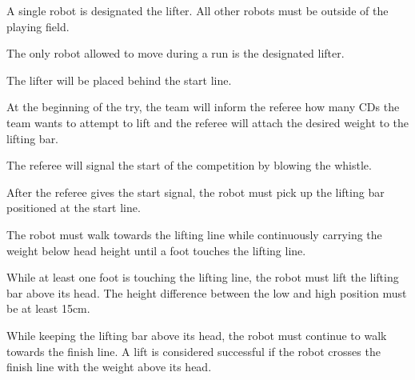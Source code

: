 \documentclass[12pt]{hurocup}
\begin{document}
\begin{lawlist}[WL]

\item A single robot is designated the lifter. All other robots
  must be outside of the playing field.

\item The only robot allowed to move during a run is the
  designated lifter.

\item The lifter will be placed behind the start line.

\item At the beginning of the try, the team will inform the
 referee how many CDs the team wants to attempt to lift and the
 referee will attach the desired weight to the lifting bar.

\item The referee will signal the start of the competition by blowing
  the whistle.

\item After the referee gives the start signal, the robot must pick up
  the lifting bar positioned at the start line.

\item The robot must walk towards the lifting line while continuously
  carrying the weight below head height until a foot touches the
  lifting line.

\item While at least one foot is touching the lifting line, the robot
  must lift the lifting bar above its head. The height difference
  between the low and high position must be at least 15cm.

\item While keeping the lifting bar above its head, the robot must
 continue to walk towards the finish line. A lift is considered
 successful if the robot crosses the finish line with the weight above
 its head.


\end{lawlist}
\end{document}
